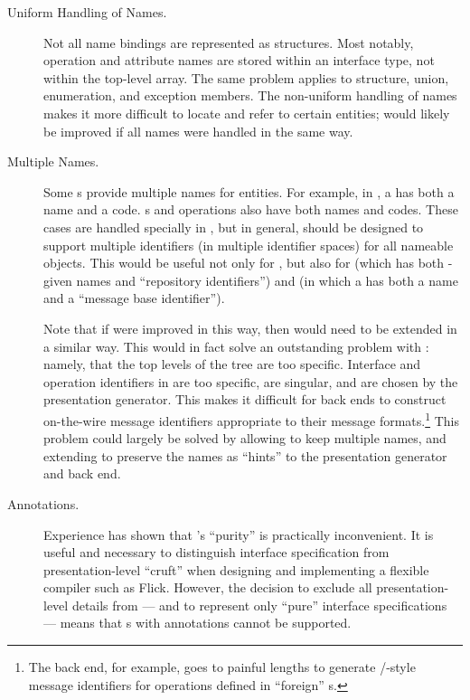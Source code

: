 \begin{description}
  \item[Uniform Handling of Names.]
  Not all name bindings are represented as  structures.  Most
  notably, operation and attribute names are stored within an interface type,
  not within the top-level  array.  The same problem applies to
  structure, union, enumeration, and exception members.  The non-uniform
  handling of names makes it more difficult to locate and refer to certain
  entities; \AOI{} would likely be improved if all names were handled in the
  same way.

  \item[Multiple Names.]
  Some \IDL{}s provide multiple names for entities.  For example, in \ONCRPC{}
  \IDL{}, a  has both a name and a code.  \ONCRPC{} s
  and operations also have both names and codes.  These cases are handled
  specially in \AOI{}, but in general, \AOI{} should be designed to support
  multiple identifiers (in multiple identifier spaces) for all nameable
  objects.  This would be useful not only for \ONCRPC{} \IDL{}, but also for
  \CORBA{} \IDL{} (which has both \IDL{}-given names and ``repository
  identifiers'') and \MIG{} \IDL{} (in which a  has both a name
  and a ``message base identifier'').

  Note that if \AOI{} were improved in this way, then \MINT{} would need to be
  extended in a similar way.  This would in fact solve an outstanding problem
  with \MINT{}: namely, that the top levels of the \MINT{} tree are too
  specific.  Interface and operation identifiers in \MINT{} are too specific,
  are singular, and are chosen by the presentation generator.  This makes it
  difficult for back ends to construct on-the-wire message identifiers
  appropriate to their message formats.\footnote{The \ONCTCP{} back end, for
  example, goes to painful lengths to generate
  /-style message identifiers for operations defined
  in ``foreign'' \IDL{}s.}  This problem could largely be solved by allowing
  \AOI{} to keep multiple names, and extending \MINT{} to preserve the names as
  ``hints'' to the presentation generator and back end.

  \item[Annotations.]
  Experience has shown that \AOI{}'s ``purity'' is practically inconvenient.
  It is useful and necessary to distinguish interface specification from
  presentation-level ``cruft'' when designing and implementing a flexible
  \IDL{} compiler such as Flick.  However, the decision to exclude all
  presentation-level details from \AOI{} --- and to represent only ``pure''
  interface specifications --- means that \IDL{}s with annotations cannot be
  supported.


\end{description}

